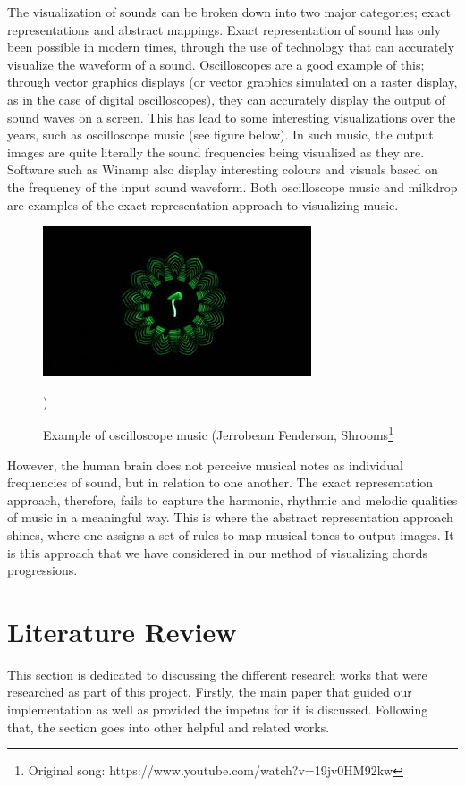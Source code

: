 \documentclass{article}
\begin{document}
The visualization of sounds can be broken down into two major categories; exact representations and abstract mappings. Exact representation of sound has only been possible in modern times, through the use of technology that can accurately visualize the waveform of a sound. Oscilloscopes are a good example of this; through vector graphics displays (or vector graphics simulated on a raster display, as in the case of digital oscilloscopes), they can accurately display the output of sound waves on a screen. This has lead to some interesting visualizations over the years, such as oscilloscope music (see figure below). In such music, the output images are quite literally the sound frequencies being visualized as they are. Software such as Winamp also display interesting colours and visuals based on the frequency of the input sound waveform. Both oscilloscope music and milkdrop are examples of the exact representation approach to visualizing music.

\begin{figure}
    \includegraphics{shrooms.jpg}
    \centering
    \caption{Example of oscilloscope music (Jerrobeam Fenderson, Shrooms\footnote{Original song: https://www.youtube.com/watch?v=19jv0HM92kw}})
    \label{fig:shrooms}
\end{figure}

However, the human brain does not perceive musical notes as individual frequencies of sound, but in relation to one another. The exact representation approach, therefore, fails to capture the harmonic, rhythmic and melodic qualities of music in a meaningful way. This is where the abstract representation approach shines, where one assigns a set of rules to map musical tones to output images. It is this approach that we have considered in our method of visualizing chords progressions.

\section{Literature Review}
This section is dedicated to discussing the different research works that were researched as part of this project. Firstly, the main paper that guided our implementation as well as provided the impetus for it is discussed. Following that, the section goes into other helpful and related works.
\end{document}
